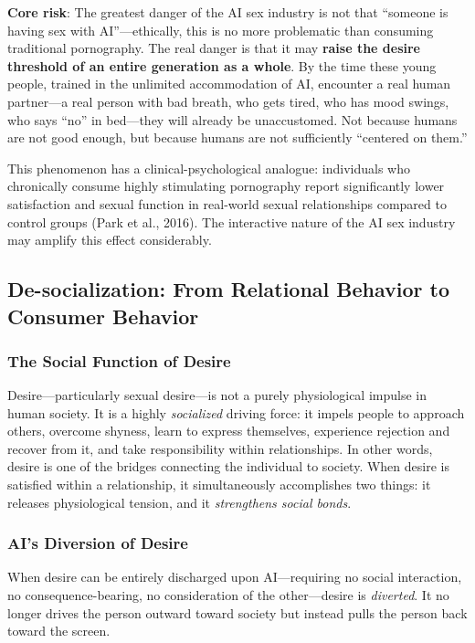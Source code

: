 ﻿\documentclass[12pt,a4paper]{article}
\begin{document}
\textbf{Core risk}: The greatest danger of the AI sex industry is not that ``someone is having sex with AI''---ethically, this is no more problematic than consuming traditional pornography. The real danger is that it may \textbf{raise the desire threshold of an entire generation as a whole}. By the time these young people, trained in the unlimited accommodation of AI, encounter a real human partner---a real person with bad breath, who gets tired, who has mood swings, who says ``no'' in bed---they will already be unaccustomed. Not because humans are not good enough, but because humans are not sufficiently ``centered on them.''

This phenomenon has a clinical-psychological analogue: individuals who chronically consume highly stimulating pornography report significantly lower satisfaction and sexual function in real-world sexual relationships compared to control groups (Park et al., 2016). The interactive nature of the AI sex industry may amplify this effect considerably.

\subsection{De-socialization: From Relational Behavior to Consumer Behavior}

\subsubsection{The Social Function of Desire}

Desire---particularly sexual desire---is not a purely physiological impulse in human society. It is a highly \emph{socialized} driving force: it impels people to approach others, overcome shyness, learn to express themselves, experience rejection and recover from it, and take responsibility within relationships. In other words, desire is one of the bridges connecting the individual to society. When desire is satisfied within a relationship, it simultaneously accomplishes two things: it releases physiological tension, and it \emph{strengthens social bonds}.

\subsubsection{AI's Diversion of Desire}

When desire can be entirely discharged upon AI---requiring no social interaction, no consequence-bearing, no consideration of the other---desire is \emph{diverted}. It no longer drives the person outward toward society but instead pulls the person back toward the screen.
\end{document}
